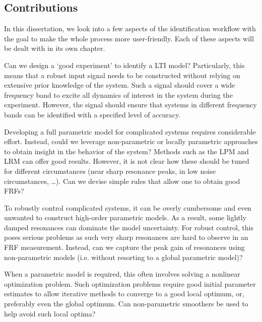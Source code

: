 \newpage
\subsection{Contributions}
In this dissertation, we look into a few aspects of the identification workflow with the goal to make the whole process more user-friendly.
Each of these aspects will be dealt with in its own chapter.

\begin{question}
Can we design a `good experiment' to identify a \gls{LTI} model?
Particularly, this means that a robust input signal needs to be constructed without relying on extensive prior knowledge of the system.
Such a signal should cover a wide frequency band to excite all dynamics of interest in the system during the experiment.
However, the signal should ensure that systems in different frequency bands can be identified with a specified level of accuracy.
\end{question}

\begin{question}
Developing a full parametric model for complicated systems requires considerable effort.
Instead, could we leverage non-parametric or locally parametric approaches to obtain insight in the behavior of the system?
Methods such as the \gls{LPM} and \gls{LRM} can offer good results.
However, it is not clear how these should be tuned for different circumstances (near sharp resonance peaks, in low noise circumstances, \ldots).
Can we devise simple rules that allow one to obtain good \glspl{FRF}?
\end{question}

\begin{question}
To robustly control complicated systems, it can be overly cumbersome and even unwanted to construct high-order parametric models.
As a result, some lightly damped resonances can dominate the model uncertainty.
For robust control, this poses serious problems as such very sharp resonances are hard to observe in an \gls{FRF} measurement.
Instead, can we capture the peak gain of resonances using non-parametric models (i.e. without resorting to a global parametric model)?
\end{question}

\begin{question}
When a parametric model is required, this often involves solving a nonlinear optimization problem.
Such optimization problems require good initial parameter estimates to allow iterative methods to converge to a good local optimum, or, preferably even the global optimum.
Can non-parametric smoothers be used to help avoid such local optima?
\end{question}

